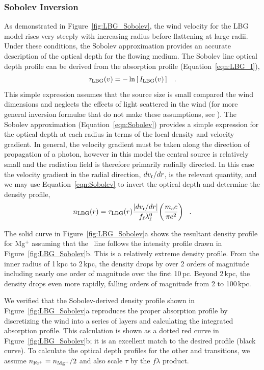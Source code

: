 \documentclass[]{emulateapj}
\begin{document}
\subsubsection{Sobolev Inversion}
\label{sec:Sobolev}

As demonstrated in Figure~\ref{fig:LBG_Sobolev}, the wind velocity for
the LBG model rises very steeply with increasing radius before
flattening at large radii.  Under these conditions, the Sobolev
approximation provides an accurate description of the optical depth
for the flowing medium. 
The Sobolev line optical depth profile can be derived from
the absorption profile (Equation~\ref{eqn:LBG_I}), 
\begin{equation}
\tau_{\rm LBG}(v) = -\ln \left [ \, I_{\rm LBG}(v) \, \right ] \;\;\; .
\label{eqn:tauLBG}
\end{equation}
This simple expression assumes that the source size is small compared the wind dimensions
and neglects the effects of light scattered in the wind (for more general inversion
formulae that do not make these assumptions, see \citet{Kasen_2002}).
The Sobolev approximation (Equation~\ref{eqn:Sobolev}) provides a simple expression for the optical
depth at each radius in terms of the local density and velocity gradient.  In general, the velocity 
 gradient must be taken along the direction of propagation of a photon, however
in this model the central source is relatively small  and the radiation
field is therefore primarily radially directed.  In this 
case the velocity gradient in the radial direction, $dv_{\rm r}/dr$, is the relevant quantity, and 
we may use Equation~\ref{eqn:Sobolev}  to invert
the optical depth and determine the density profile,
\begin{equation}
n_{\rm LBG}(r) =  \tau_{\rm LBG}(r)  \frac{ |dv_{\rm r}/dr |}{f_\ell  \lambda^0_\ell}
\biggl( \frac{ m_e c}{\pi e^2} \biggl)
 \;\;\; .
\label{eqn:nSobolev}
\end{equation}


The solid curve in Figure~\ref{fig:LBG_Sobolev}a shows the
resultant density profile for Mg$^+$ assuming that the \mgiia\ line
follows the intensity profile drawn in Figure~\ref{fig:LBG_Sobolev}b. 
This is a relatively extreme density profile.  From the inner radius
of 1\,kpc to 2\,kpc, the density drops by over 2 orders of
magnitude including nearly one order of magnitude over the first
10\,pc.  Beyond 2\,kpc, the density drops even more rapidly, falling
orders of magnitude from 2 to 100\,kpc.

We verified that the Sobolev-derived density profile shown in
Figure~\ref{fig:LBG_Sobolev}a
reproduces the proper
absorption profile by discretizing the wind into a series of layers
and calculating the integrated absorption profile.  This
calculation is shown as a dotted red curve in
Figure~\ref{fig:LBG_Sobolev}b; it is an excellent
match to the desired profile (black curve).
To calculate the optical depth profiles for the other  and
 transitions, we
assume $n_{\rm Fe^+} = n_{\rm Mg^+}/2$ and also scale $\tau$ by the $f\lambda$ product.
\end{document}
